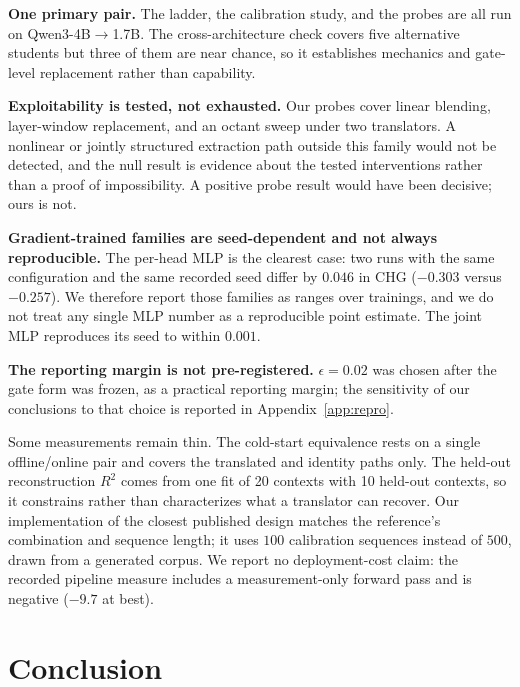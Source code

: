\documentclass[10pt]{article}
\begin{document}
\textbf{One primary pair.} The ladder, the calibration study, and the probes are
all run on Qwen3-4B$\to$1.7B. The cross-architecture check covers five
alternative students but three of them are near chance, so it establishes
mechanics and gate-level replacement rather than capability.

\textbf{Exploitability is tested, not exhausted.} Our probes cover linear
blending, layer-window replacement, and an octant sweep under two translators. A
nonlinear or jointly structured extraction path outside this family would not be
detected, and the null result is evidence about the tested interventions rather
than a proof of impossibility. A positive probe result would have been decisive;
ours is not.

\textbf{Gradient-trained families are seed-dependent and not always
reproducible.} The per-head MLP is the clearest case: two runs with the same
configuration and the same recorded seed differ by $0.046$ in CHG
($-0.303$ versus $-0.257$). We therefore report those families as ranges over
trainings, and we do not treat any single MLP number as a reproducible point
estimate. The joint MLP reproduces its seed to within $0.001$.

\textbf{The reporting margin is not pre-registered.} $\epsilon{=}0.02$ was
chosen after the gate form was frozen, as a practical reporting margin; the
sensitivity of our conclusions to that choice is reported in
Appendix~\ref{app:repro}.

Some measurements remain thin. The cold-start equivalence rests on a single
offline/online pair and covers the translated and identity paths only. The
held-out reconstruction $R^2$ comes from one fit of 20 contexts with 10 held-out
contexts, so it constrains rather than characterizes what a translator can recover.
Our implementation of the closest published design matches the reference's
combination and sequence length; it uses $100$ calibration sequences instead of
$500$, drawn from a generated corpus. We report no deployment-cost claim: the
recorded pipeline measure includes a measurement-only forward pass and is
negative ($-9.7$ at best).


\section{Conclusion}
\label{sec:conclusion}
\end{document}
